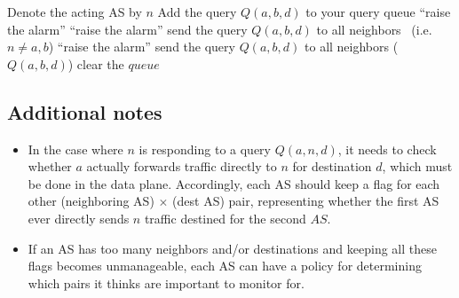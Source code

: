 \documentclass[10pt]{article}
\begin{document}
  \begin{algorithmic}
    \State Denote the acting AS by $n$
        \State Add the query $Q(a,b,d)$ to your query queue
      \EndFor
    \EndFunction
        \State \Return
      \EndIf
      	  \State ``raise the alarm''
	\EndIf
	\State \Return
      \EndIf
          \State``raise the alarm''
        \EndIf
        \State send the query $Q(a,b,d)$ to all neighbors
      \Else \ (i.e. $n \neq a,b$)
          \State ``raise the alarm''
        \Else
        \State send the query $Q(a,b,d)$ to all neighbors
        \EndIf
      \EndIf
    \EndFunction
        ($Q(a,b,d)$)
      \EndFor
      \State clear the $queue$
    \EndFunction

  \end{algorithmic}
  
  \subsection{Additional notes}
  \begin{itemize}
  \item In the case where $n$ is responding to a query $Q(a,n,d)$, it needs to check whether $a$ actually forwards traffic directly to $n$ for destination $d$, which must be done in the data plane. Accordingly, each AS should keep a flag for each other (neighboring AS) $\times$ (dest AS) pair, representing whether the first AS ever directly sends $n$ traffic destined for the second $AS$.
  \item If an AS has too many neighbors and/or destinations and keeping all these flags becomes unmanageable, each AS can have a policy for determining which pairs it thinks are important to monitor for.
  \end{itemize}

\begin{comment}
We can put all the details of the protocol implementation here

  One subtlety to note: the ASes should maybe start out by asking
  \emph{themselves} whatever next-hop queries they have. E.g. in {\sc GrandMa},
  node $a$ can immediately tell that $m$ isn't telling the truth,
  because $m$ says he forwards traffic to $a$, but doesn't.
    
\end{comment}
\end{document}
